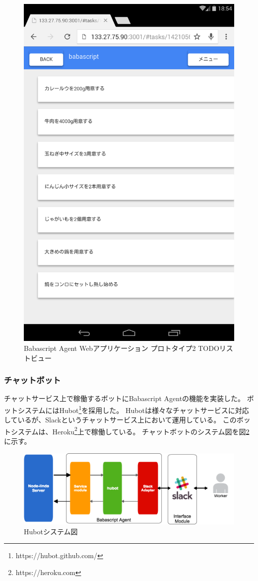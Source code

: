 \begin{figure}[htbp]
  \begin{center}
  \includegraphics[width=.5\linewidth,bb=0 0 1200 1920]{images/webapp-interface-v2.png}
  \end{center}
  \caption{Babascript Agent Webアプリケーション プロトタイプ2 TODOリストビュー}
  \label{fig:webapp-interface-v2}
\end{figure}

\subsubsection{チャットボット}\label{ux30c1ux30e3ux30c3ux30c8ux30dcux30c3ux30c8}

チャットサービス上で稼働するボットにBabascript Agentの機能を実装した。
ボットシステムにはHubot\footnote{https://hubot.github.com/}を採用した。
Hubotは様々なチャットサービスに対応しているが、Slackというチャットサービス上において運用している。
このボットシステムは、Heroku\footnote{https://heroku.com}上で稼働している。
チャットボットのシステム図を図\ref{fig:hubot-system}に示す。

\begin{figure}[htbp]
  \begin{center}
  \includegraphics[width=.9\linewidth,bb=0 0 936 312]{images/hubot-system.png}
  \end{center}
  \caption{Hubotシステム図}
  \label{fig:hubot-system}
\end{figure}

